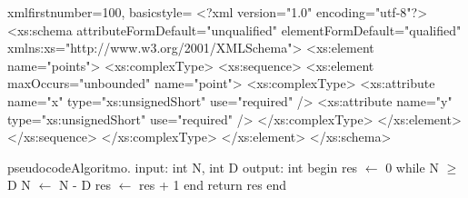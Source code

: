\begin{sourcecodep}{xml}{firstnumber=100, basicstyle={\fontsize{7}{10}\selectfont\ttfamily}}{}
<?xml version="1.0" encoding="utf-8"?>
<xs:schema attributeFormDefault="unqualified" elementFormDefault="qualified"
   xmlns:xs="http://www.w3.org/2001/XMLSchema">
  <xs:element name="points">
    <xs:complexType>
      <xs:sequence>
        <xs:element maxOccurs="unbounded" name="point">
          <xs:complexType>
            <xs:attribute name="x" type="xs:unsignedShort" use="required" />
            <xs:attribute name="y" type="xs:unsignedShort" use="required" />
          </xs:complexType>
        </xs:element>
      </xs:sequence>
    </xs:complexType>
  </xs:element>
</xs:schema>
\end{sourcecodep}

\newpage
\begin{sourcecode}{pseudocode}{Algoritmo.}
input: int N, int D
output: int
begin
	res $\gets$ 0
	while N $\geq$ D 
		N $\gets$ N - D
		res $\gets$ res + 1      
	end
	return res
end    
\end{sourcecode}